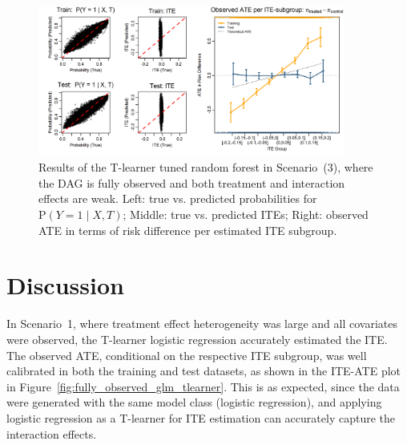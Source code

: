 \begin{figure}[htbp]
\centering
\includegraphics[width=0.9\textwidth]{img/results_ITE_simulation/small_interaction_tuned_rf_tlearner.png}
\caption{Results of the T-learner tuned random forest in Scenario~(3), where the DAG is fully observed and both treatment and interaction effects are weak. Left: true vs. predicted probabilities for $\text{P}(Y = 1 \mid X, T)$; Middle: true vs. predicted ITEs; Right: observed ATE in terms of risk difference per estimated ITE subgroup.}
\label{fig:small_interaction_tuned_rf_tlearner}
\end{figure}


\FloatBarrier




\section{Discussion} \label{sec:disc_experiment3}



In Scenario~1, where treatment effect heterogeneity was large and all covariates were observed, the T-learner logistic regression accurately estimated the ITE. The observed ATE, conditional on the respective ITE subgroup, was well calibrated in both the training and test datasets, as shown in the ITE-ATE plot in Figure~\ref{fig:fully_observed_glm_tlearner}. This is as expected, since the data were generated with the same model class (logistic regression), and applying logistic regression as a T-learner for ITE estimation can accurately capture the interaction effects.

